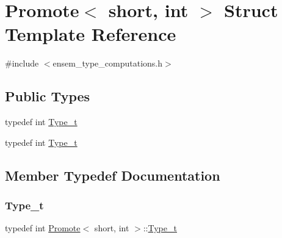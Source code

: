 \hypertarget{structPromote_3_01short_00_01int_01_4}{}\section{Promote$<$ short, int $>$ Struct Template Reference}
\label{structPromote_3_01short_00_01int_01_4}


{\ttfamily \#include $<$ensem\+\_\+type\+\_\+computations.\+h$>$}

\subsection*{Public Types}
\begin{DoxyCompactItemize}
\item 
typedef int \mbox{\hyperlink{structPromote_3_01short_00_01int_01_4_a4c576886bac5096bb59339397d07ab38}{Type\+\_\+t}}
\item 
typedef int \mbox{\hyperlink{structPromote_3_01short_00_01int_01_4_a4c576886bac5096bb59339397d07ab38}{Type\+\_\+t}}
\end{DoxyCompactItemize}


\subsection{Member Typedef Documentation}
\mbox{\label{structPromote_3_01short_00_01int_01_4_a4c576886bac5096bb59339397d07ab38}} 
\subsubsection{\texorpdfstring{Type\_t}{Type\_t}\hspace{0.1cm}{\footnotesize\ttfamily [1/2]}}
{\footnotesize\ttfamily typedef int \mbox{\hyperlink{structPromote}{Promote}}$<$ short, int $>$\+::\mbox{\hyperlink{structPromote_3_01short_00_01int_01_4_a4c576886bac5096bb59339397d07ab38}{Type\+\_\+t}}}

\mbox{\label{structPromote_3_01short_00_01int_01_4_a4c576886bac5096bb59339397d07ab38}} 
